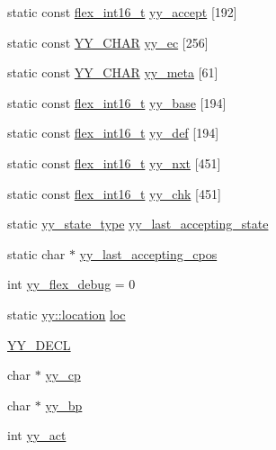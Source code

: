 \begin{DoxyCompactItemize}
\item 
static const \hyperlink{_genesys_09_09-scanner_8cpp_a2e73b2c75126814585525fb2e9d51159}{flex\-\_\-int16\-\_\-t} \hyperlink{_genesys_09_09-scanner_8cpp_a04feddd2bf03bd0c4a38caa913d40dfe}{yy\-\_\-accept} \mbox{[}192\mbox{]}
\item 
static const \hyperlink{_genesys_09_09-scanner_8cpp_acc1e625a829554ffed5e4307d4a5f6b7}{Y\-Y\-\_\-\-C\-H\-A\-R} \hyperlink{_genesys_09_09-scanner_8cpp_ada99416c769550cb1bfd063fec16039a}{yy\-\_\-ec} \mbox{[}256\mbox{]}
\item 
static const \hyperlink{_genesys_09_09-scanner_8cpp_acc1e625a829554ffed5e4307d4a5f6b7}{Y\-Y\-\_\-\-C\-H\-A\-R} \hyperlink{_genesys_09_09-scanner_8cpp_a228a82549c54eabe947c11f136d084b3}{yy\-\_\-meta} \mbox{[}61\mbox{]}
\item 
static const \hyperlink{_genesys_09_09-scanner_8cpp_a2e73b2c75126814585525fb2e9d51159}{flex\-\_\-int16\-\_\-t} \hyperlink{_genesys_09_09-scanner_8cpp_a3957db0c8e9ca44a14b97d031d9b1970}{yy\-\_\-base} \mbox{[}194\mbox{]}
\item 
static const \hyperlink{_genesys_09_09-scanner_8cpp_a2e73b2c75126814585525fb2e9d51159}{flex\-\_\-int16\-\_\-t} \hyperlink{_genesys_09_09-scanner_8cpp_a1298f0bc536600b0bf0afc339d7ea1ba}{yy\-\_\-def} \mbox{[}194\mbox{]}
\item 
static const \hyperlink{_genesys_09_09-scanner_8cpp_a2e73b2c75126814585525fb2e9d51159}{flex\-\_\-int16\-\_\-t} \hyperlink{_genesys_09_09-scanner_8cpp_a9f6d66f8c7d0f1927b1ab1ffe1b213ca}{yy\-\_\-nxt} \mbox{[}451\mbox{]}
\item 
static const \hyperlink{_genesys_09_09-scanner_8cpp_a2e73b2c75126814585525fb2e9d51159}{flex\-\_\-int16\-\_\-t} \hyperlink{_genesys_09_09-scanner_8cpp_a9e979c5d6951ccdf702352bddc70c3cd}{yy\-\_\-chk} \mbox{[}451\mbox{]}
\item 
static \hyperlink{_genesys_09_09-scanner_8cpp_a9ba7c416f135b0f0c1f4addded4616b5}{yy\-\_\-state\-\_\-type} \hyperlink{_genesys_09_09-scanner_8cpp_a1e8856234732c99be24858b0073e1297}{yy\-\_\-last\-\_\-accepting\-\_\-state}
\item 
static char $\ast$ \hyperlink{_genesys_09_09-scanner_8cpp_afc6bef71feb2394eb5291e710139dfb3}{yy\-\_\-last\-\_\-accepting\-\_\-cpos}
\item 
int \hyperlink{_genesys_09_09-scanner_8cpp_a7411c3bab9eca1afee90113c2d22da37}{yy\-\_\-flex\-\_\-debug} = 0
\item 
static \hyperlink{classyy_1_1location}{yy\-::location} \hyperlink{_genesys_09_09-scanner_8cpp_abaf70dc7df8e78acc6505d164cb2276b}{loc}
\item 
\hyperlink{_genesys_09_09-scanner_8cpp_abcefb20c54ce0f92452cfbb9cf657670}{Y\-Y\-\_\-\-D\-E\-C\-L}
\item 
char $\ast$ \hyperlink{_genesys_09_09-scanner_8cpp_a61b01b6b236b05090b972f8fd95da539}{yy\-\_\-cp}
\item 
char $\ast$ \hyperlink{_genesys_09_09-scanner_8cpp_aa749693ef7d0c10b137e887638fdc5b2}{yy\-\_\-bp}
\item 
int \hyperlink{_genesys_09_09-scanner_8cpp_a483da4c691e92dcb79c40a3514759b6b}{yy\-\_\-act}
\end{DoxyCompactItemize}


